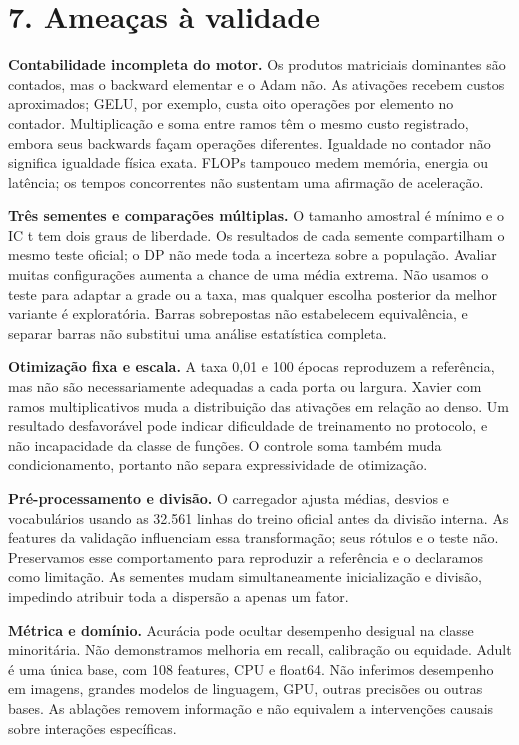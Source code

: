 \documentclass[10pt,a4paper]{article}
\begin{document}
\clearpage

\section*{7. Ameaças à validade}
\textbf{Contabilidade incompleta do motor.} Os produtos matriciais dominantes são contados, mas o backward elementar e o Adam não. As ativações recebem custos aproximados; GELU, por exemplo, custa oito operações por elemento no contador. Multiplicação e soma entre ramos têm o mesmo custo registrado, embora seus backwards façam operações diferentes. Igualdade no contador não significa igualdade física exata. FLOPs tampouco medem memória, energia ou latência; os tempos concorrentes não sustentam uma afirmação de aceleração.


\textbf{Três sementes e comparações múltiplas.} O tamanho amostral é mínimo e o IC t tem dois graus de liberdade. Os resultados de cada semente compartilham o mesmo teste oficial; o DP não mede toda a incerteza sobre a população. Avaliar muitas configurações aumenta a chance de uma média extrema. Não usamos o teste para adaptar a grade ou a taxa, mas qualquer escolha posterior da melhor variante é exploratória. Barras sobrepostas não estabelecem equivalência, e separar barras não substitui uma análise estatística completa.


\textbf{Otimização fixa e escala.} A taxa 0,01 e 100 épocas reproduzem a referência, mas não são necessariamente adequadas a cada porta ou largura. Xavier com ramos multiplicativos muda a distribuição das ativações em relação ao denso. Um resultado desfavorável pode indicar dificuldade de treinamento no protocolo, e não incapacidade da classe de funções. O controle soma também muda condicionamento, portanto não separa expressividade de otimização.


\textbf{Pré-processamento e divisão.} O carregador ajusta médias, desvios e vocabulários usando as 32.561 linhas do treino oficial antes da divisão interna. As features da validação influenciam essa transformação; seus rótulos e o teste não. Preservamos esse comportamento para reproduzir a referência e o declaramos como limitação. As sementes mudam simultaneamente inicialização e divisão, impedindo atribuir toda a dispersão a apenas um fator.


\textbf{Métrica e domínio.} Acurácia pode ocultar desempenho desigual na classe minoritária. Não demonstramos melhoria em recall, calibração ou equidade. Adult é uma única base, com 108 features, CPU e float64. Não inferimos desempenho em imagens, grandes modelos de linguagem, GPU, outras precisões ou outras bases. As ablações removem informação e não equivalem a intervenções causais sobre interações específicas.
\end{document}
